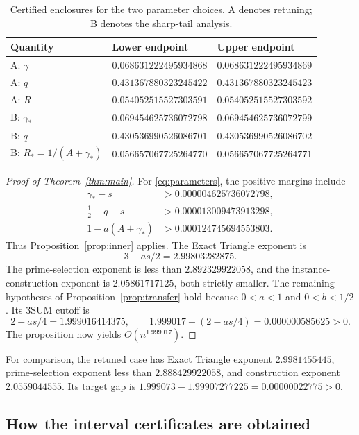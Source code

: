 \documentclass[11pt,a4paper]{article}
\theoremstyle{remark}
\newcommand{\gam}{\gamma_{\!*}}
\begin{document}
\begin{table}[htbp]
\centering\small
\begin{tabular}{@{}lll@{}}
\toprule
Quantity & Lower endpoint & Upper endpoint\\
\midrule
A: $\gamma$ & $0.068631222495934868$ & $0.068631222495934869$\\
A: $q$ & $0.431367880323245422$ & $0.431367880323245423$\\
A: $R$ & $0.054052515527303591$ & $0.054052515527303592$\\
\addlinespace
B: $\gam$ & $0.069454625736072798$ & $0.069454625736072799$\\
B: $q$ & $0.430536990526086701$ & $0.430536990526086702$\\
B: $R_*=1/(A+\gam)$ & $0.056657067725264770$ & $0.056657067725264771$\\
\bottomrule
\end{tabular}
\caption{Certified enclosures for the two parameter choices. A denotes
retuning; B denotes the sharp-tail analysis.}\label{tab:intervals}
\end{table}

\begin{proof}[Proof of Theorem~\ref{thm:main}]
For \eqref{eq:parameters}, the positive margins include
\begin{align*}
 \gam-s&>0.000004625736072798,\\
 \tfrac12-q-s&>0.000013009473913298,\\
 1-a(A+\gam)&>0.000124745694553803.
\end{align*}
Thus Proposition~\ref{prop:inner} applies. The Exact Triangle exponent is
\[
 3-as/2=2.99803282875.
\]
The prime-selection exponent is less than $2.892329922058$, and the
instance-construction exponent is $2.05861717125$, both strictly smaller.
The remaining hypotheses of Proposition~\ref{prop:transfer} hold because
$0<a<1$ and $0<b<1/2$. Its 3SUM cutoff is
\[
 2-as/4=1.999016414375,
 \qquad 1.999017-(2-as/4)=0.000000585625>0.
\]
The proposition now yields $O(n^{1.999017})$.
\end{proof}

For comparison, the retuned case has Exact Triangle exponent
$2.9981455445$, prime-selection exponent less than $2.888429922058$,
and construction exponent $2.0559044555$. Its target gap is
$1.999073-1.99907277225=0.00000022775>0$.

\subsection{How the interval certificates are obtained}
\end{document}
